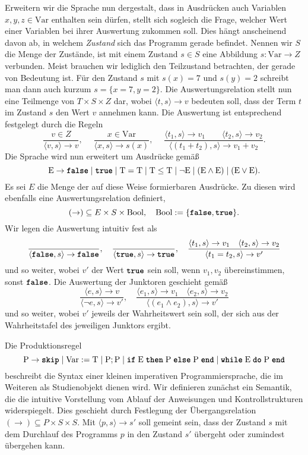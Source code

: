 Erweitern wir die Sprache nun dergestalt, dass in Ausdrücken auch
Variablen $x,y,z\in\mathrm{Var}$ enthalten sein dürfen, stellt sich
sogleich die Frage, welcher Wert einer Variablen bei ihrer Auswertung
zukommen soll. Dies hängt anscheinend davon ab, in welchem \emph{Zustand}
sich das Programm gerade befindet. Nennen wir $S$ die Menge der Zustände,
ist mit einem Zustand $s\in S$ eine Abbildung $s\colon\mathrm{Var}\to Z$
verbunden. Meist brauchen wir lediglich den Teilzustand betrachten, der
gerade von Bedeutung ist. Für den Zustand $s$ mit $s(x)=7$ und $s(y)=2$
schreibt man dann auch kurzum $s=\{x=7,y=2\}$. Die Auswertungsrelation stellt
nun eine Teilmenge von $T\times S\times Z$ dar, wobei $\langle t,s\rangle\to v$
bedeuten soll, dass der Term $t$ im Zustand $s$ den Wert $v$ annehmen
kann. Die Auswertung ist entsprechend festgelegt durch die Regeln
\[\dfrac{v\in Z}{\langle v,s\rangle\to v},\quad\;
\dfrac{x\in\mathrm{Var}}{\langle x,s\rangle\to s(x)},\quad\;
\dfrac{\langle t_1,s\rangle\to v_1\qquad \langle t_2,s\rangle\to v_2}
{\langle (t_1+t_2),s\rangle\to v_1+v_2}.\]
Die Sprache wird nun erweitert um Ausdrücke gemäß
\[\mathrm E \to\kw{false}\mid\kw{true}\mid\mathrm T = \mathrm T\mid
\mathrm T \le \mathrm T\mid \lnot\mathrm E\mid
(\mathrm E\land\mathrm E)\mid (\mathrm E\lor\mathrm E).\]
Es sei $E$ die Menge der auf diese Weise formierbaren Ausdrücke.
Zu diesen wird ebenfalls eine Auswertungsrelation definiert,
\[(\to)\subseteq E\times S\times\mathrm{Bool},\quad
\mathrm{Bool} := \{\kw{false},\kw{true}\}.\]
Wir legen die Auswertung intuitiv fest als
\[\dfrac{}{\langle\kw{false},s\rangle\to\kw{false}},\quad
\dfrac{}{\langle\kw{true},s\rangle\to\kw{true}},\quad
\dfrac{\langle t_1,s\rangle\to v_1\quad\langle t_2,s\rangle\to v_2}
{\langle t_1=t_2, s\rangle\to v'}\]
und so weiter, wobei $v'$ der Wert $\kw{true}$ sein soll, wenn $v_1,v_2$
übereinstimmen, sonst $\kw{false}$. Die Auswertung der Junktoren geschieht gemäß
\[\dfrac{\langle e,s\rangle\to v}{\langle\lnot e,s\rangle\to v'},\quad
\dfrac{\langle e_1,s\rangle\to v_1\quad\langle e_2,s\rangle\to v_2}
{\langle (e_1\land e_2),s\rangle\to v'}\]
und so weiter, wobei $v'$ jeweils der Wahrheitswert sein soll, der
sich aus der Wahrheitstafel des jeweiligen Junktors ergibt.

Die Produktionsregel
\[\mathrm P \to \kw{skip}\mid \mathrm{Var} := \mathrm T \mid\mathrm P;\mathrm P\mid
\kw{if}\;\mathrm E\;\kw{then}\;\mathrm P\;\kw{else}\;\mathrm P\;\kw{end}
\mid\kw{while}\;\mathrm E\;\kw{do}\;\mathrm P\;\kw{end}\]
beschreibt die Syntax einer kleinen imperativen Programmiersprache,
die im Weiteren als Studienobjekt dienen wird. Wir definieren zunächst
ein Semantik, die die intuitive Vorstellung vom Ablauf der Anweisungen
und Kontrollstrukturen widerspiegelt. Dies geschieht durch Festlegung
der Übergangsrelation $(\to)\subseteq P\times S\times S$. Mit
$\langle p,s\rangle\to s'$ soll gemeint sein, dass der Zustand $s$ mit dem
Durchlauf des Programms $p$ in den Zustand $s'$ übergeht oder zumindest
übergehen kann.

